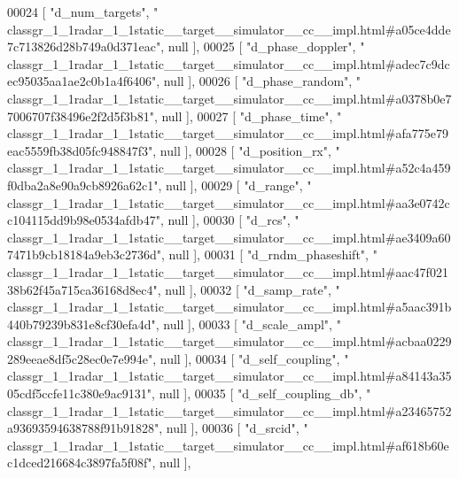 \begin{DoxyCode}
00024     [ \textcolor{stringliteral}{"d\_num\_targets"}, \textcolor{stringliteral}{"
      classgr\_1\_1radar\_1\_1static\_\_target\_\_simulator\_\_cc\_\_impl.html#a05ce4dde7c713826d28b749a0d371eac"}, null ],
00025     [ \textcolor{stringliteral}{"d\_phase\_doppler"}, \textcolor{stringliteral}{"
      classgr\_1\_1radar\_1\_1static\_\_target\_\_simulator\_\_cc\_\_impl.html#adec7c9dcec95035aa1ae2c0b1a4f6406"}, null ],
00026     [ \textcolor{stringliteral}{"d\_phase\_random"}, \textcolor{stringliteral}{"
      classgr\_1\_1radar\_1\_1static\_\_target\_\_simulator\_\_cc\_\_impl.html#a0378b0e77006707f38496e2f2d5f3b81"}, null ],
00027     [ \textcolor{stringliteral}{"d\_phase\_time"}, \textcolor{stringliteral}{"
      classgr\_1\_1radar\_1\_1static\_\_target\_\_simulator\_\_cc\_\_impl.html#afa775e79eac5559fb38d05fc948847f3"}, null ],
00028     [ \textcolor{stringliteral}{"d\_position\_rx"}, \textcolor{stringliteral}{"
      classgr\_1\_1radar\_1\_1static\_\_target\_\_simulator\_\_cc\_\_impl.html#a52c4a459f0dba2a8e90a9cb8926a62c1"}, null ],
00029     [ \textcolor{stringliteral}{"d\_range"}, \textcolor{stringliteral}{"
      classgr\_1\_1radar\_1\_1static\_\_target\_\_simulator\_\_cc\_\_impl.html#aa3e0742cc104115dd9b98e0534afdb47"}, null ],
00030     [ \textcolor{stringliteral}{"d\_rcs"}, \textcolor{stringliteral}{"
      classgr\_1\_1radar\_1\_1static\_\_target\_\_simulator\_\_cc\_\_impl.html#ae3409a607471b9cb18184a9eb3c2736d"}, null ],
00031     [ \textcolor{stringliteral}{"d\_rndm\_phaseshift"}, \textcolor{stringliteral}{"
      classgr\_1\_1radar\_1\_1static\_\_target\_\_simulator\_\_cc\_\_impl.html#aac47f02138b62f45a715ca36168d8ec4"}, null ],
00032     [ \textcolor{stringliteral}{"d\_samp\_rate"}, \textcolor{stringliteral}{"
      classgr\_1\_1radar\_1\_1static\_\_target\_\_simulator\_\_cc\_\_impl.html#a5aac391b440b79239b831e8cf30efa4d"}, null ],
00033     [ \textcolor{stringliteral}{"d\_scale\_ampl"}, \textcolor{stringliteral}{"
      classgr\_1\_1radar\_1\_1static\_\_target\_\_simulator\_\_cc\_\_impl.html#acbaa0229289eeae8df5c28ec0e7e994e"}, null ],
00034     [ \textcolor{stringliteral}{"d\_self\_coupling"}, \textcolor{stringliteral}{"
      classgr\_1\_1radar\_1\_1static\_\_target\_\_simulator\_\_cc\_\_impl.html#a84143a3505cdf5ccfe11c380e9ac9131"}, null ],
00035     [ \textcolor{stringliteral}{"d\_self\_coupling\_db"}, \textcolor{stringliteral}{"
      classgr\_1\_1radar\_1\_1static\_\_target\_\_simulator\_\_cc\_\_impl.html#a23465752a93693594638788f91b91828"}, null ],
00036     [ \textcolor{stringliteral}{"d\_srcid"}, \textcolor{stringliteral}{"
      classgr\_1\_1radar\_1\_1static\_\_target\_\_simulator\_\_cc\_\_impl.html#af618b60ec1dced216684c3897fa5f08f"}, null ],

\end{DoxyCode}
